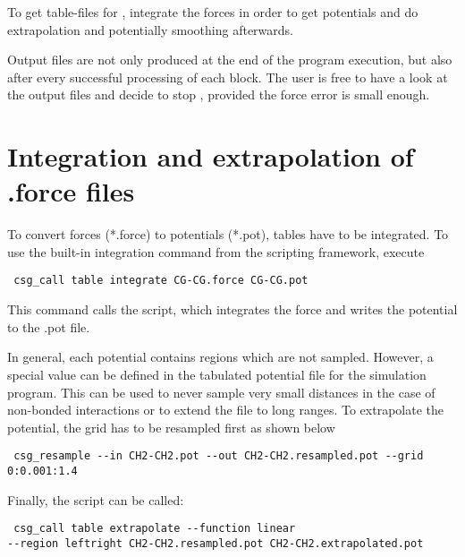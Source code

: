 To get table-files for \gromacs, integrate the forces in order to get potentials and do extrapolation and potentially smoothing afterwards.

Output files are not only produced at the end of the program execution, but also after every successful processing of each block. The user is free to have a look at the output files and decide to stop , provided the force error is small enough.

\section{Integration and extrapolation of .force files }
To convert forces (*.force) to potentials (*.pot), tables have to be integrated. To use the built-in integration command from the scripting framework, execute
\begin{verbatim}
 csg_call table integrate CG-CG.force CG-CG.pot
\end{verbatim}

This command calls the  script, which integrates the force and writes the potential to the .pot file.

In general, each potential contains regions which are not sampled. However, a special value can be defined in the tabulated potential file for the simulation program. This can be used to never sample very small distances in the case of non-bonded interactions or to extend the file to long ranges. To extrapolate the potential, the grid has to be resampled first as shown below
\begin{verbatim}
 csg_resample --in CH2-CH2.pot --out CH2-CH2.resampled.pot --grid 0:0.001:1.4
\end{verbatim}

Finally, the  script can be called:
\begin{verbatim}
 csg_call table extrapolate --function linear
--region leftright CH2-CH2.resampled.pot CH2-CH2.extrapolated.pot
\end{verbatim}
